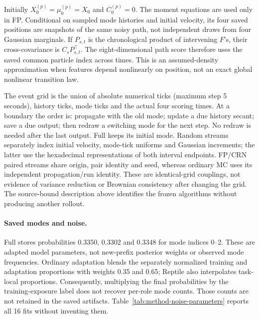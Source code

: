 Initially \(X_0^{(p)}=\mu_0^{(p)}=X_0\) and \(C_0^{(p)}=0\).
The moment equations are used only in FP. Conditional on sampled mode
histories and initial velocity, its four saved positions are snapshots of the
same noisy path, not independent draws from four Gaussian marginals. If
\(P_{s,t}\) is the chronological product of intervening \(F\)'s, their
cross-covariance is \(C_sP_{s,t}^{\top}\). The eight-dimensional path score
therefore uses the saved common particle index across times. This is an
assumed-density approximation when features depend nonlinearly on position,
not an exact global nonlinear transition law.

The event grid is the union of absolute numerical ticks (maximum step
5 seconds), history ticks, mode ticks and the actual four scoring times.
At a boundary the order is: propagate with the old mode; update a due history
secant; save a due output; then redraw a switching mode for the next step.
No redraw is needed after the last output. Full keeps its initial mode.
Random streams separately index initial velocity, mode-tick uniforms and
Gaussian increments; the latter use the hexadecimal representations of both
interval endpoints. FP/CRN paired streams share origin, pair identity and
seed, whereas ordinary MC uses its independent propagation/run identity.
These are identical-grid couplings, not evidence of variance reduction or
Brownian consistency after changing the grid. The source-bound description
above identifies the frozen algorithms without producing another rollout.

\paragraph{Saved modes and noise.}
Full stores probabilities 0.3350, 0.3302 and 0.3348 for mode indices
0--2. These are adapted model parameters, not new-prefix posterior weights
or observed mode frequencies. Ordinary adaptation blends the separately
normalized training and adaptation proportions with weights 0.35 and 0.65;
Reptile also interpolates task-local proportions. Consequently, multiplying
the final probabilities by the training-exposure label does not recover
per-role mode counts. Those counts are not retained in the saved artifacts.
Table~\ref{tab:method-noise-parameters} reports all 16 fits without inventing them.

